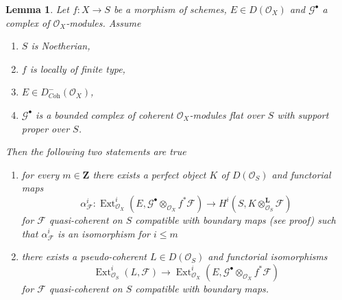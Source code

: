 \documentclass{amsart}
\theoremstyle{plain}
\newtheorem{lemma}[subsection]{Lemma}
\theoremstyle{definition}
\theoremstyle{remark}
\numberwithin{equation}{subsection}
\def\Ext{\mathop{\mathrm{Ext}}\nolimits}
\begin{document}
\begin{lemma}
\label{lemma-compute-ext}
Let $f : X \to S$ be a morphism of schemes, $E \in D(\mathcal{O}_X)$
and $\mathcal{G}^\bullet$ a complex of $\mathcal{O}_X$-modules.
Assume
\begin{enumerate}
\item $S$ is Noetherian,
\item $f$ is locally of finite type,
\item $E \in D^-_{\textit{Coh}}(\mathcal{O}_X)$,
\item $\mathcal{G}^\bullet$ is a bounded complex of
coherent $\mathcal{O}_X$-modules flat over $S$ with support proper over $S$.
\end{enumerate}
Then the following two statements are true
\begin{enumerate}
\item[(A)] for every $m \in \mathbf{Z}$ there exists a perfect object $K$
of $D(\mathcal{O}_S)$ and functorial maps
$$
\alpha^i_\mathcal{F} :
\Ext^i_{\mathcal{O}_X}(E,
\mathcal{G}^\bullet \otimes_{\mathcal{O}_X} f^*\mathcal{F})
\longrightarrow
H^i(S, K \otimes^\mathbf{L}_{\mathcal{O}_S} \mathcal{F})
$$
for $\mathcal{F}$ quasi-coherent on $S$ compatible with boundary maps
(see proof) such that $\alpha^i_\mathcal{F}$ is an isomorphism for $i \leq m$
\item[(B)] there exists a pseudo-coherent $L \in D(\mathcal{O}_S)$
and functorial isomorphisms
$$
\Ext^i_{\mathcal{O}_S}(L, \mathcal{F}) \longrightarrow
\Ext^i_{\mathcal{O}_X}(E,
\mathcal{G}^\bullet \otimes_{\mathcal{O}_X} f^*\mathcal{F})
$$
for $\mathcal{F}$ quasi-coherent on $S$ compatible with boundary maps.
\end{enumerate}
\end{lemma}
\end{document}
